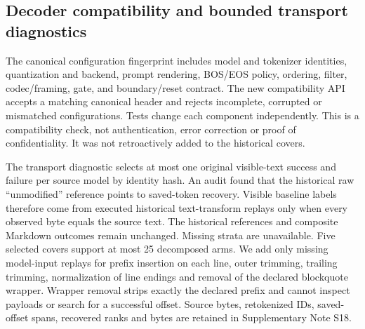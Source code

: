 

\subsection*{Decoder compatibility and bounded transport diagnostics}\label{sec:v4-compatibility}
The canonical configuration fingerprint includes model and tokenizer identities, quantization and backend, prompt rendering, BOS/EOS policy, ordering, filter, codec/framing, gate, and boundary/reset contract. The new compatibility API accepts a matching canonical header and rejects incomplete, corrupted or mismatched configurations. Tests change each component independently. This is a compatibility check, not authentication, error correction or proof of confidentiality. It was not retroactively added to the historical covers.

The transport diagnostic selects at most one original visible-text success and failure per source model by identity hash. An audit found that the historical raw ``unmodified'' reference points to saved-token recovery. Visible baseline labels therefore come from executed historical text-transform replays only when every observed byte equals the source text. The historical references and composite Markdown outcomes remain unchanged. Missing strata are unavailable. Five selected covers support at most 25 decomposed arms. We add only missing model-input replays for prefix insertion on each line, outer trimming, trailing trimming, normalization of line endings and removal of the declared blockquote wrapper. Wrapper removal strips exactly the declared prefix and cannot inspect payloads or search for a successful offset. Source bytes, retokenized IDs, saved-offset spans, recovered ranks and bytes are retained in Supplementary Note S18.
